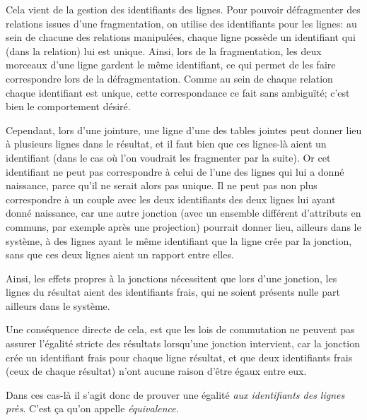 Cela vient de la gestion des identifiants des lignes.
Pour pouvoir défragmenter des relations issues d'une
fragmentation, on utilise des identifiants pour les lignes:
au sein de chacune des relations manipulées, chaque ligne
possède un identifiant qui (dans la relation) 
lui est unique.
Ainsi, lors de la fragmentation, les deux morceaux
d'une ligne gardent le même identifiant,
ce qui permet de les faire correspondre lors de la 
défragmentation.
Comme au sein de chaque relation chaque identifiant
est unique, cette correspondance ce fait sans ambiguïté;
c'est bien le comportement désiré.

Cependant, lors d'une jointure, une ligne d'une des tables
jointes peut donner lieu à plusieurs lignes dans
le résultat, et il faut bien que ces lignes-là aient
un identifiant
(dans le cas où l'on voudrait les fragmenter par
la suite). Or cet identifiant ne peut pas correspondre
à celui de l'une des lignes qui lui a donné naissance,
parce qu'il ne serait alors pas unique.
Il ne peut pas non plus correspondre à un couple
avec les deux identifiants des deux lignes lui ayant
donné naissance, car une autre jonction
(avec un ensemble différent d'attributs en communs,
par exemple après une projection) pourrait donner
lieu, ailleurs dans le système,
à des lignes ayant le même identifiant que la ligne
crée par la jonction, sans que ces deux lignes aient
un rapport entre elles.

Ainsi, les effets propres à la jonctions nécessitent
que lors d'une jonction, les lignes du résultat 
aient des identifiants frais, qui ne soient
présents nulle part ailleurs dans le système.

Une conséquence directe de cela, est que
les lois de commutation ne peuvent pas assurer l'égalité
stricte des résultats lorsqu'une jonction intervient,
car la jonction crée un identifiant frais pour chaque
ligne résultat, et que deux identifiants frais
(ceux de chaque résultat) n'ont aucune raison d'être
égaux entre eux.

Dans ces cas-là il s'agit donc de prouver une 
égalité \emph{aux identifiants des lignes près}.
C'est ça qu'on appelle \emph{équivalence}.